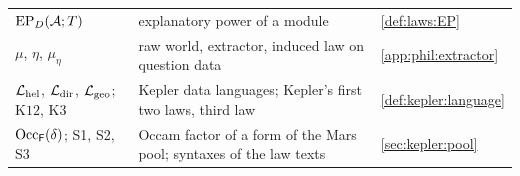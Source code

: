 {\begin{longtable}{@{}>{\raggedright\arraybackslash}p{}>{\raggedright\arraybackslash}p{}>{\raggedright\arraybackslash}p{}@{}}
$\mathrm{EP}_D(\mathcal A;T)$ & explanatory power of a module & \cref{def:laws:EP}\\
$\mu$, $\eta$, $\mu_\eta$ & raw world, extractor, induced law on question data & \cref{app:phil:extractor}\\
$\mathcal L_{\rm hel}$, $\mathcal L_{\rm dir}$, $\mathcal L_{\rm geo}$; $\mathrm{K12}$, $\mathrm{K3}$ & Kepler data languages; Kepler's first two laws, third law & \cref{def:kepler:language}\\
$\mathrm{Occ}_{\mathsf F}(\delta)$; S1, S2, S3 & Occam factor of a form of the Mars pool; syntaxes of the law texts & \cref{sec:kepler:pool}\\
\end{longtable}}
